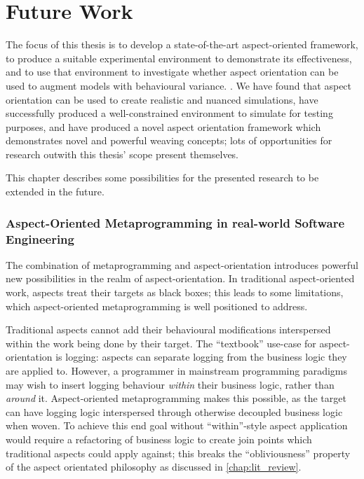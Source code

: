 \chapter{Future Work}\label{chap:future_work}

The focus of this thesis is to develop a state-of-the-art aspect-oriented
framework, to produce a suitable experimental environment to demonstrate its
effectiveness, and to use that environment to investigate whether aspect
orientation can be used to augment models with behavioural variance. . We
have found that aspect orientation can be used to create realistic and nuanced
simulations, have successfully produced a well-constrained environment to
simulate for testing purposes, and have produced a novel aspect orientation
framework which demonstrates novel and powerful weaving concepts; lots of
opportunities for research outwith this thesis' scope present themselves.

This chapter describes some possibilities for the presented research to be
extended in the future.


\subsection{Aspect-Oriented Metaprogramming in real-world Software Engineering}
\label{subsec:aspect_oriented_metaprogramming}

The combination of metaprogramming and aspect-orientation introduces powerful
new possibilities in the realm of aspect-orientation. In traditional
aspect-oriented work, aspects treat their targets as black boxes; this leads to
some limitations, which aspect-oriented metaprogramming is well positioned to
address.

Traditional aspects cannot add their behavioural modifications interspersed
within the work being done by their target. The ``textbook'' use-case for
aspect-orientation is logging: aspects can separate logging from the business
logic they are applied to. However, a programmer in mainstream programming
paradigms may wish to insert logging behaviour \emph{within} their business
logic, rather than \emph{around} it. Aspect-oriented metaprogramming makes this
possible, as the target can have logging logic interspersed through otherwise
decoupled business logic when woven. To achieve this end goal without
``within''-style aspect application would require a refactoring of business
logic to create join points which traditional aspects could apply against; this
breaks the ``obliviousness'' property of the aspect orientated philosophy as
discussed in \cref{chap:lit_review}.


